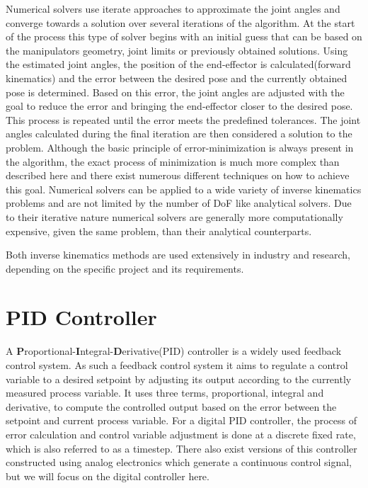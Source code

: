 Numerical solvers use iterate approaches to approximate the joint angles and converge towards a solution over several iterations of the algorithm.
At the start of the process this type of solver begins with an initial guess that can be based on the manipulators geometry, joint limits or previously obtained solutions.
Using the estimated joint angles, the position of the end-effector is calculated(forward kinematics) and the error between the desired pose and the currently obtained pose is determined.
Based on this error, the joint angles are adjusted with the goal to reduce the error and bringing the end-effector closer to the desired pose.
This process is repeated until the error meets the predefined tolerances.
The joint angles calculated during the final iteration are then considered a solution to the problem.
Although the basic principle of error-minimization is always present in the algorithm, the exact process of minimization is much more complex than described here and there exist numerous different techniques on how to achieve this goal.
Numerical solvers can be applied to a wide variety of inverse kinematics problems and are not limited by the number of DoF like analytical solvers.
Due to their iterative nature numerical solvers are generally more computationally expensive, given the same problem, than their analytical counterparts.

Both inverse kinematics methods are used extensively in industry and research, depending on the specific project and its requirements.




\section{PID Controller}
A \textbf{P}roportional-\textbf{I}ntegral-\textbf{D}erivative(PID) controller is a widely used feedback control system.
As such a feedback control system it aims to regulate a control variable to a desired setpoint by adjusting its output according to the currently measured process variable.
It uses three terms, proportional, integral and derivative, to compute the controlled output  based on the error between the setpoint and current process variable.
For a digital PID controller, the process of error calculation and control variable adjustment is done at a discrete fixed rate, which is also referred to as a timestep.
There also exist versions of this controller constructed using analog electronics which generate a continuous control signal, but we will focus on the digital controller here.

